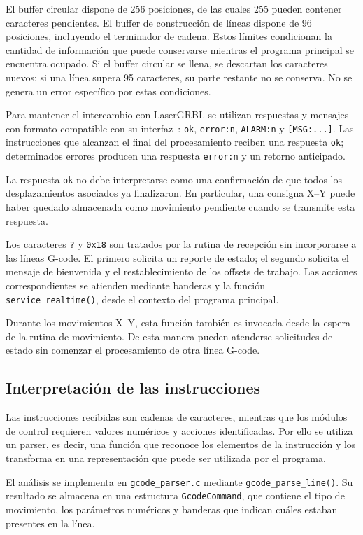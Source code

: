 \documentclass[blue,fullpaper]{ludusofficial}  %
\begin{document}
El buffer circular dispone de 256 posiciones, de las
cuales 255 pueden contener caracteres pendientes.
El buffer de construcción de líneas dispone de 96
posiciones, incluyendo el terminador de cadena.
Estos límites condicionan la cantidad de información
que puede conservarse mientras el programa principal
se encuentra ocupado. Si el buffer circular se llena, se descartan los caracteres nuevos; si una línea supera 95 caracteres, su parte restante no se conserva. No se genera un error específico por estas condiciones.

Para mantener el intercambio con LaserGRBL se utilizan
respuestas y mensajes con formato compatible con su
interfaz~\cite{grbl_interface}: \texttt{ok}, \texttt{error:n},
\texttt{ALARM:n} y \texttt{[MSG:...]}.
Las instrucciones que alcanzan el final del procesamiento
reciben una respuesta \texttt{ok}; determinados errores
producen una respuesta \texttt{error:n} y un retorno
anticipado.

La respuesta \texttt{ok} no debe interpretarse como
una confirmación de que todos los desplazamientos
asociados ya finalizaron. En particular, una consigna
X--Y puede haber quedado almacenada como movimiento
pendiente cuando se transmite esta respuesta.

Los caracteres \texttt{?} y \texttt{0x18} son tratados
por la rutina de recepción sin incorporarse a las líneas
G-code. El primero solicita un reporte de estado;
el segundo solicita el mensaje de bienvenida y
el restablecimiento de los offsets de trabajo.
Las acciones correspondientes se atienden mediante
banderas y la función \texttt{service\_realtime()},
desde el contexto del programa principal.

Durante los movimientos X--Y, esta función también
es invocada desde la espera de la rutina de movimiento.
De esta manera pueden atenderse solicitudes de estado
sin comenzar el procesamiento de otra línea G-code.

\subsection{Interpretación de las instrucciones}

Las instrucciones recibidas son cadenas de caracteres,
mientras que los módulos de control requieren valores
numéricos y acciones identificadas. Por ello se utiliza
un parser, es decir, una función que reconoce los
elementos de la instrucción y los transforma en una
representación que puede ser utilizada por el programa.

El análisis se implementa en \texttt{gcode\_parser.c}
mediante \texttt{gcode\_parse\_line()}. Su resultado
se almacena en una estructura \texttt{GcodeCommand},
que contiene el tipo de movimiento, los parámetros
numéricos y banderas que indican cuáles estaban
presentes en la línea.
\end{document}

